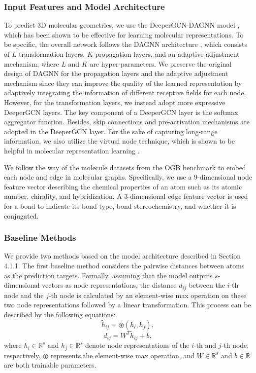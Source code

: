 \documentclass{article}
\begin{document}
\subsubsection{Input Features and Model Architecture}
To predict 3D molecular geometries, we use the DeeperGCN-DAGNN model \cite{liu2021fast}, which has been shown to be effective for learning molecular representations. To be specific, the overall network follows the DAGNN architecture \cite{liu2020towards}, which consists of $L$ transformation layers, $K$ propagation layers, and an adaptive adjustment mechanism, where $L$ and $K$ are hyper-parameters. We preserve the original design of DAGNN for the propagation layers and the adaptive adjustment mechanism since they can improve the quality of the learned representation by adaptively integrating the information of different receptive fields for each node. However, for the transformation layers, we instead adopt more expressive DeeperGCN \cite{li2020deepergcn} layers. The key component of a DeeperGCN layer is the softmax aggregator function. Besides, skip connections \cite{he2016deep} and pre-activation \cite{he2016identity} mechanisms are adopted in the DeeperGCN layer. For the sake of capturing long-range information, we also utilize the virtual node technique, which is shown to be helpful in molecular representation learning \cite{gilmer2017neural,hu2021ogb}.

We follow the way of the molecule datasets from the OGB \cite{hu2020open} benchmark to embed each node and edge in molecular graphs. Specifically, we use a 9-dimensional node feature vector describing the chemical properties of an atom such as its atomic number, chirality, and hybridization. A 3-dimensional edge feature vector is used for a bond to indicate its bond type, bond stereochemistry, and whether it is conjugated.

\subsubsection{Baseline Methods}
We provide two  methods based on the model architecture described in Section 4.1.1. The first baseline method considers the pairwise distances between atoms as the prediction targets. Formally, assuming that the model outputs $s$-dimensional vectors as node representations, the distance $d_{ij}$ between the $i$-th node and the $j$-th node is calculated by an element-wise max operation on these two node representations followed by a linear transformation. This process can be described by the following equations:
\begin{equation}
    \tilde{h}_{ij}=\circledast\left(h_i, h_j\right),
\end{equation}
\begin{equation}
    d_{ij} = W^T\tilde{h}_{ij}+b,
\end{equation}
where $h_i\in\mathbb{R}^s$ and $h_j\in\mathbb{R}^s$ denote node representations of the $i$-th and $j$-th node, respectively, $\circledast$ represents the element-wise max operation, and $W\in\mathbb{R}^s$ and $b\in\mathbb{R}$ are both trainable parameters.
\end{document}
